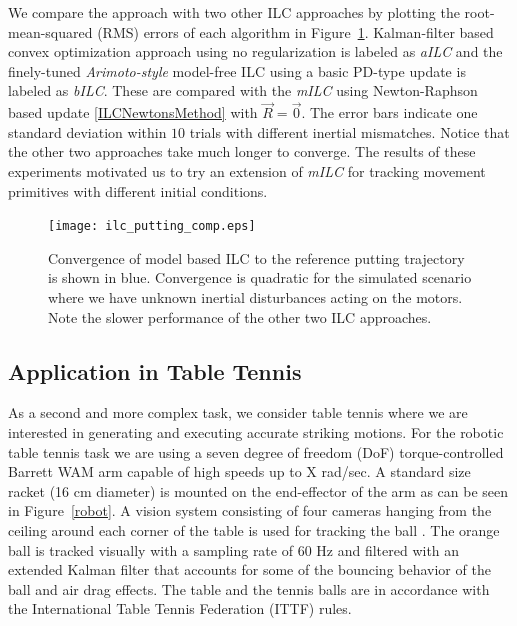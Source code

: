 We compare the approach with two other ILC approaches by plotting the root-mean-squared (RMS) errors of each algorithm in Figure~\ref{ILCTrajectoryPutting}. Kalman-filter based convex optimization approach \cite{Schoellig12} using no regularization is labeled as \emph{aILC} and the finely-tuned \emph{Arimoto-style} \cite{Arimoto84} model-free ILC using a basic PD-type update is labeled as \emph{bILC}. These are compared with the \emph{mILC} using Newton-Raphson based update \eqref{ILCNewtonsMethod} with $\vec{R} = \vec{0}$. The error bars indicate one standard deviation within $10$ trials with different inertial mismatches. Notice that the other two approaches take much longer to converge. The results of these experiments motivated us to try an extension of \emph{mILC} for tracking movement primitives with different initial conditions.

\begin{figure}
\centering
\texttt{[image: ilc\_putting\_comp.eps]}
\caption{Convergence of model based ILC to the reference putting trajectory is shown in blue. Convergence is quadratic for the simulated scenario where we have unknown inertial disturbances acting on the motors. Note the slower performance of the other two ILC approaches.}
\label{ILCTrajectoryPutting}
\end{figure}


\subsection{Application in Table Tennis}


As a second and more complex task, we consider table tennis where we are interested in generating and executing accurate striking motions. For the robotic table tennis task we are using a seven degree of freedom (DoF) torque-controlled Barrett WAM arm capable of high speeds up to X rad/sec. A standard size racket (16 cm diameter) is mounted on the end-effector of the arm as can be seen in Figure~\ref{robot}. A vision system consisting of four cameras hanging from the ceiling around each corner of the table is used for tracking the ball \cite{Lampert12}. The orange ball is tracked  visually with a sampling rate of 60 Hz and filtered with an extended Kalman filter that accounts for some of the bouncing behavior of the ball and air drag effects. The table and the tennis balls are in accordance with the International Table Tennis Federation (ITTF) rules.

